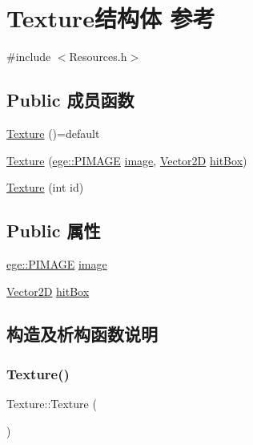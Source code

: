 \hypertarget{struct_texture}{}\section{Texture结构体 参考}
\label{struct_texture}


{\ttfamily \#include $<$Resources.\+h$>$}

\subsection*{Public 成员函数}
\begin{DoxyCompactItemize}
\item 
\hyperlink{struct_texture_a66179be276016021e80b1c67c047d4ad}{Texture} ()=default
\item 
\hyperlink{struct_texture_af59bcad788f8cdb48b1690e0ab31e095}{Texture} (\hyperlink{namespaceege_a72e07306fee47bc08f1baf842cb681fb}{ege\+::\+P\+I\+M\+A\+GE} \hyperlink{struct_texture_ac4b0ce38664ca13285a077c12277e753}{image}, \hyperlink{_vector2_d_8hpp_aa1f1145650f1dd9bddf7335ec6434d7c}{Vector2D} \hyperlink{struct_texture_a1142de09bebe1683ee67c816953f9ad1}{hit\+Box})
\item 
\hyperlink{struct_texture_a654c58271c71ff72ea2a417ea33e65d2}{Texture} (int id)
\end{DoxyCompactItemize}
\subsection*{Public 属性}
\begin{DoxyCompactItemize}
\item 
\hyperlink{namespaceege_a72e07306fee47bc08f1baf842cb681fb}{ege\+::\+P\+I\+M\+A\+GE} \hyperlink{struct_texture_ac4b0ce38664ca13285a077c12277e753}{image}
\item 
\hyperlink{_vector2_d_8hpp_aa1f1145650f1dd9bddf7335ec6434d7c}{Vector2D} \hyperlink{struct_texture_a1142de09bebe1683ee67c816953f9ad1}{hit\+Box}
\end{DoxyCompactItemize}


\subsection{构造及析构函数说明}
\mbox{\label{struct_texture_a66179be276016021e80b1c67c047d4ad}} 
\subsubsection{\texorpdfstring{Texture()}{Texture()}\hspace{0.1cm}{\footnotesize\ttfamily [1/3]}}
{\footnotesize\ttfamily Texture\+::\+Texture (\begin{DoxyParamCaption}{ }\end{DoxyParamCaption})\hspace{0.3cm}{\ttfamily [default]}}

